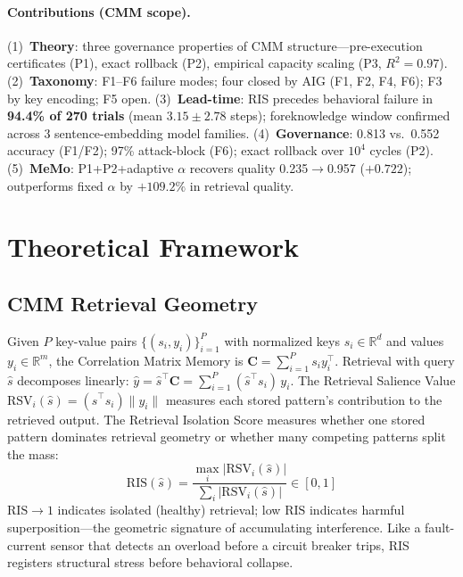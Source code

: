 \documentclass{ceurart}
\newcommand{\RSV}{\mathrm{RSV}}
\newcommand{\RIS}{\mathrm{RIS}}
\newcommand{\CMM}{\mathbf{C}}
\begin{document}
\paragraph{Contributions (CMM scope).}
(1)~\textbf{Theory}: three governance properties of CMM structure---pre-execution
certificates (P1), exact rollback (P2), empirical capacity scaling (P3, $R^2{=}0.97$).
(2)~\textbf{Taxonomy}: F1--F6 failure modes; four closed by AIG (F1, F2, F4, F6); F3 by key encoding; F5 open.
(3)~\textbf{Lead-time}: RIS precedes behavioral failure in \textbf{94.4\% of 270 trials}
(mean $3.15\pm2.78$ steps); foreknowledge window confirmed across 3 sentence-embedding model families.
(4)~\textbf{Governance}: 0.813 vs.\ 0.552 accuracy (F1/F2); 97\% attack-block (F6); exact rollback
over $10^4$ cycles (P2).
(5)~\textbf{MeMo}: P1+P2+adaptive $\alpha$ recovers quality 0.235$\to$0.957
($+0.722$); outperforms fixed $\alpha$ by $+109.2\%$ in retrieval quality.


\section{Theoretical Framework}
\label{sec:theory}

\subsection{CMM Retrieval Geometry}

Given $P$ key-value pairs $\{(s_i, y_i)\}_{i=1}^{P}$ with normalized keys
$s_i \in \mathbb{R}^d$ and values $y_i \in \mathbb{R}^m$, the Correlation
Matrix Memory is $\CMM = \sum_{i=1}^{P} s_i y_i^\top$.
Retrieval with query $\hat{s}$ decomposes linearly:
$\hat{y} = \hat{s}^\top\CMM = \sum_{i=1}^{P} (\hat{s}^\top s_i)\,y_i$.
The Retrieval Salience Value $\RSV_i(\hat{s}) = (\hat{s}^\top s_i)\|y_i\|$
measures each stored pattern's contribution to the retrieved output.
The Retrieval Isolation Score measures whether one stored pattern dominates
retrieval geometry or whether many competing patterns split the mass:
\begin{equation}
  \RIS(\hat{s}) = \frac{\max_i|\RSV_i(\hat{s})|}{\sum_i|\RSV_i(\hat{s})|}
  \in [0,1]
  \label{eq:ris}
\end{equation}
$\RIS \to 1$ indicates isolated (healthy) retrieval; low $\RIS$ indicates
harmful superposition---the geometric signature of accumulating interference.
Like a fault-current sensor that detects an overload before a circuit breaker
trips, RIS registers structural stress before behavioral collapse.
\end{document}
